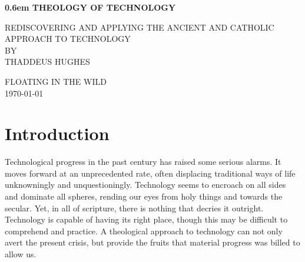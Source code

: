 \documentclass[letterpaper]{article}
\begin{document}
\clearpage
\newcommand\nbvspace[1][3]{\vspace*{\stretch{#1}}}
\newcommand\nbstretchyspace{\spaceskip0.5em plus 0.25em minus 0.25em}
\newcommand{\nbtitlestretch}{\spaceskip0.6em}
\pagestyle{plain}
\begin{center}
  \bfseries
  \nbvspace[1]
  \Huge
  {\nbtitlestretch\huge
    THEOLOGY OF TECHNOLOGY}

  \nbvspace[1]
  \normalsize
  REDISCOVERING AND APPLYING THE ANCIENT AND CATHOLIC APPROACH TO TECHNOLOGY\\

  \nbvspace[1]
  \small BY\\
  \Large THADDEUS HUGHES\\

  \nbvspace[2]

  \nbvspace[3]
  \normalsize

  \large
  FLOATING IN THE WILD \\
  \small \MakeUppercase{\today} \\
\end{center}

\raggedbottom
\tableofcontents

\newpage


\section{Introduction}

Technological progress in the past century has raised some serious alarms. It moves forward at an unprecedented rate, often displacing traditional ways of life unknowningly and unquestioningly. Technology seems to encroach on all sides and dominate all spheres, rending our eyes from holy things and towards the secular. Yet, in all of scripture, there is nothing that decries it outright. Technology is capable of having its right place, though this may be difficult to comprehend and practice. A theological approach to technology can not only avert the present crisis, but provide the fruits that material progress was billed to allow us.
\end{document}
